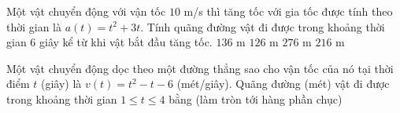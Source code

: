 \begin{ex}%
	Một vật chuyển động với vận tốc $10$ m/s thì tăng  tốc với gia tốc được tính theo thời gian là $a(t)=t^2+3t$. Tính quãng đường vật đi được trong khoảng thời gian $6$ giây kể từ khi vật bắt đầu tăng tốc.
	 \choice
		{$136$  m}
		{$126$ m} 
		 {\True $276$ m}
		{$216$ m} 
\end{ex}

\begin{bt}%
	Một vật chuyển động dọc theo một đường thẳng sao cho vận tốc của nó tại thời điểm $t$ (giây) là $v(t)=t^2-t-6$ (mét/giây). Quãng đường (mét) vật đi được trong khoảng thời gian $1 \le t \le 4$  bằng (làm tròn tới hàng phần chục)
\end{bt}

